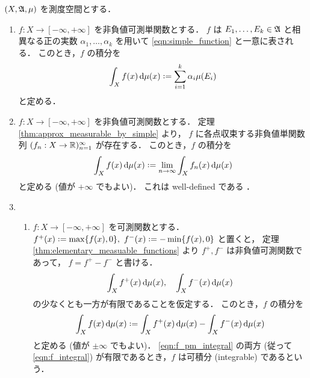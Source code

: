 \begin{definition}
    $(X,\mathfrak{A},\mu)$ を測度空間とする．
    \begin{enumerate}
        \item $f:X\to[-\infty,+\infty]$ を非負値可測単関数とする．
            $f$ は $E_1,\ldots,E_k\in\mathfrak{A}$ と相異なる正の実数 $\alpha_1,\ldots,\alpha_k$ を用いて
            \eqref{eqn:simple_function} と一意に表される．
            このとき，$f$ の積分を
            \begin{align*}
                \int_Xf(x)\,\drm\mu(x)\defeq\sum_{i=1}^k\alpha_i\mu(E_i)
            \end{align*}
            と定める．
        \item $f:X\to[-\infty,+\infty]$ を非負値可測関数とする．
            定理 \ref{thm:approx_measurable_by_simple} より，
            $f$ に各点収束する非負値単関数列 $(f_n:X\to\mathbb{R})_{n=1}^\infty$ が存在する．
            このとき，$f$ の積分を
            \begin{align*}
                \int_Xf(x)\,\drm\mu(x)\defeq\lim_{n\to\infty}\int_Xf_n(x)\,\drm\mu(x)
            \end{align*}
            と定める (値が $+\infty$ でもよい)．
            これは well-defined である \cite[pp.74--77]{It63}．
        \item
            \begin{enumerate}
                \item
                    $f:X\to[-\infty,+\infty]$ を可測関数とする．
                    $f^+(x)\defeq\max\{f(x),0\},\ f^-(x)\defeq-\min\{f(x),0\}$ と置くと，
                    定理 \ref{thm:elementary_measuable_functions} より $f^+,f^-$ は非負値可測関数であって，
                    $f=f^+-f^-$ と書ける．
                    \begin{align}
                        \int_Xf^+(x)\,\mathrm{d}\mu(x),\quad
                        \int_Xf^-(x)\,\mathrm{d}\mu(x)
                        \label{eqn:f_pm_integral}
                    \end{align}
                    の少なくとも一方が有限であることを仮定する．
                    このとき，$f$ の積分を
                    \begin{align}
                        \int_Xf(x)\,\drm\mu(x)\defeq\int_Xf^+(x)\,\drm\mu(x)-\int_Xf^-(x)\,\drm\mu(x)
                        \label{eqn:f_integral}
                    \end{align}
                    と定める (値が $\pm\infty$ でもよい)．
                    \eqref{eqn:f_pm_integral} の両方 (従って \eqref{eqn:f_integral}) が有限であるとき，$f$ は可積分 (integrable) であるという．

\end{enumerate}
\end{enumerate}
\end{definition}
